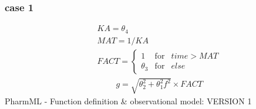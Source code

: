 \documentclass[a4paper,10pt]{article}
\begin{document}
\subsubsection{case 1}
\begin{eqnarray}
&&KA = \theta_4 \nonumber \\
&&MAT = 1/KA \nonumber \\
&&FACT = \left\{ \begin{array}{rcl}  1 & \mbox{for}  & time > MAT \\
\theta_3  & \mbox{for} & else  \nonumber
\end{array}\right.
\end{eqnarray}
\begin{eqnarray}
&&g = \sqrt{\theta_2^2 + \theta_1^2 f^2} \times FACT \nonumber
\end{eqnarray}
PharmML - Function definition \& observational model:
VERSION 1
\end{document}
